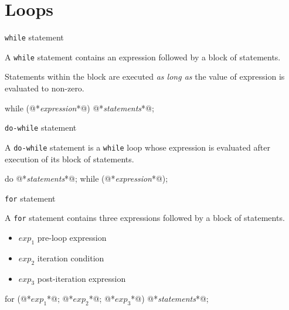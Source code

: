 \documentclass[compress]{beamer}
\begin{document}
\section{Loops}

\begin{slide}
	\begin{block}{\texttt{while} statement}

	A \texttt{while} statement contains an expression followed by a block of statements.

	Statements within the block are executed \emph{as long as} the value of expression is evaluated to non-zero.

	\begin{terminal}
	while (@*\textit{expression}*@) {
	    @*\textit{statements}*@;
	}
	\end{terminal}

	\end{block}
\end{slide}

\begin{slide}
	\begin{block}{\texttt{do-while} statement}

	A \texttt{do-while} statement is a \texttt{while} loop whose expression is evaluated after execution of its block of statements.

	\begin{terminal}
	do {
	    @*\textit{statements}*@;
	} while (@*\textit{expression}*@);
	\end{terminal}

	\end{block}
\end{slide}

\begin{slide}
	\begin{block}{\texttt{for} statement}

	A \texttt{for} statement contains three expressions followed by a block of statements.

	\begin{itemize}
	\item[] $\mathit{exp}_1$ pre-loop expression
	\item[] $\mathit{exp}_2$ iteration condition
	\item[] $\mathit{exp}_3$ post-iteration expression
	\end{itemize}

	\begin{terminal}
	for (@*$\mathit{exp}_1$*@; @*$\mathit{exp}_2$*@; @*$\mathit{exp}_3$*@) {
	    @*\textit{statements}*@;
	}
	\end{terminal}

	\end{block}
\end{slide}
\end{document}
